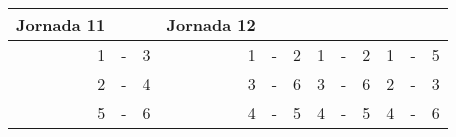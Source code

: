 \documentclass[12pt,a4paper,table]{article}
\theoremstyle{break}
\begin{document}
\begin{center}
\begin{tabular}[]{|rcl|rcl|rcl|rcl|}
	Jornada 11 & \hspace{1em} & \hspace{1em} &
	Jornada 12 & \hspace{1em} & \hspace{1em} \\ \hline
	1 & - & 3  &  1 & - & 2  &  1 & - & 2  &  1 & - & 5 \\ \hline
	2 & - & 4  &  3 & - & 6  &  3 & - & 6  &  2 & - & 3 \\ \hline
	5 & - & 6  &  4 & - & 5  &  4 & - & 5  &  4 & - & 6 \\ \hline
\end{tabular}\end{center}
\end{document}
